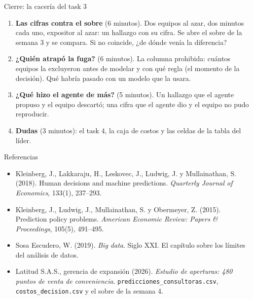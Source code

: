 \documentclass{beamer}
\begin{document}
\begin{frame}{Cierre: la cacería del task 3}
\begin{enumerate}\itemsep8pt
  \item \textbf{Las cifras contra el sobre} (6 minutos). Dos equipos al azar, dos minutos cada uno, expositor al azar: un hallazgo con su cifra. Se abre el sobre de la semana 3 y se compara. Si no coincide, ¿de dónde venía la diferencia?
  \item \textbf{¿Quién atrapó la fuga?} (6 minutos). La columna prohibida: cuántos equipos la excluyeron antes de modelar y con qué regla (el momento de la decisión). Qué habría pasado con un modelo que la usara.
  \item \textbf{¿Qué hizo el agente de más?} (5 minutos). Un hallazgo que el agente propuso y el equipo descartó; una cifra que el agente dio y el equipo no pudo reproducir.
  \item \textbf{Dudas} (3 minutos): el task 4, la caja de costos y las celdas de la tabla del líder.
\end{enumerate}
\end{frame}

\begin{frame}{Referencias}
\small
\begin{itemize}\itemsep4pt
  \item Kleinberg, J., Lakkaraju, H., Leskovec, J., Ludwig, J. y Mullainathan, S. (2018). Human decisions and machine predictions. \emph{Quarterly Journal of Economics}, 133(1), 237--293.
  \item Kleinberg, J., Ludwig, J., Mullainathan, S. y Obermeyer, Z. (2015). Prediction policy problems. \emph{American Economic Review: Papers \& Proceedings}, 105(5), 491--495.
  \item Sosa Escudero, W. (2019). \emph{Big data}. Siglo XXI. El capítulo sobre los límites del análisis de datos.
  \item Latitud S.A.S., gerencia de expansión (2026). \emph{Estudio de aperturas: 480 puntos de venta de conveniencia}. \texttt{predicciones\_consultoras.csv}, \texttt{costos\_decision.csv} y el sobre de la semana 4.
\end{itemize}
\end{frame}
\end{document}
